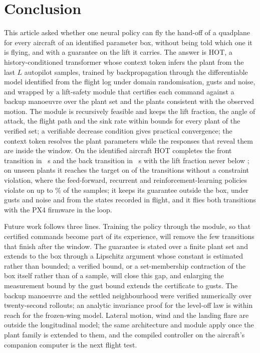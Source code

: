 \section{Conclusion}\label{sec:conclusion}
This article asked whether one neural policy can fly the hand-off of a quadplane for every aircraft of an identified parameter box, without being told which one it is flying, and with a guarantee on the lift it carries. The answer is HOT, a history-conditioned transformer whose context token infers the plant from the last $L$ autopilot samples, trained by backpropagation through the differentiable model identified from the flight log under domain randomisation, gusts and noise, and wrapped by a lift-safety module that certifies each command against a backup manoeuvre over the plant set and the plants consistent with the observed motion. The module is recursively feasible and keeps the lift fraction, the angle of attack, the flight path and the sink rate within bounds for every plant of the verified set; a verifiable decrease condition gives practical convergence; the context token resolves the plant parameters while the responses that reveal them are inside the window. On the identified aircraft HOT completes the front transition in \hotFrontT{}~s and the back transition in \hotBackT{}~s with the lift fraction never below \hotFrontLf{}; on \numCross{} unseen plants it reaches the target on \hotCrossReached{} of the transitions without a constraint violation, where the feed-forward, recurrent and reinforcement-learning policies violate on up to \maxOtherCrossViol{}\% of the samples; it keeps its guarantee outside the box, under gusts and noise and from the states recorded in flight, and it flies both transitions with the PX4 firmware in the loop.

Future work follows three lines. Training the policy through the module, so that certified commands become part of its experience, will remove the few transitions that finish after the window. The guarantee is stated over a finite plant set and extends to the box through a Lipschitz argument whose constant is estimated rather than bounded; a verified bound, or a set-membership contraction of the box itself rather than of a sample, will close this gap, and enlarging the measurement bound by the gust bound extends the certificate to gusts. The backup manoeuvre and the settled neighbourhood were verified numerically over twenty-second rollouts; an analytic invariance proof for the level-off law is within reach for the frozen-wing model. Lateral motion, wind and the landing flare are outside the longitudinal model; the same architecture and module apply once the plant family is extended to them, and the compiled controller on the aircraft's companion computer is the next flight test.
